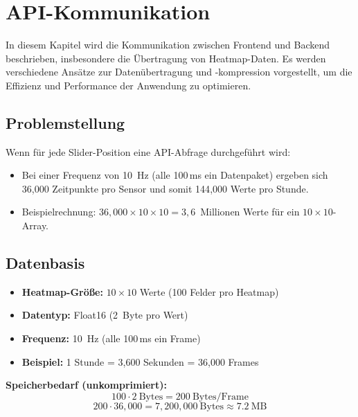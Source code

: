 \chapter{API-Kommunikation}
\label{cha:api_kommunikation}
In diesem Kapitel wird die Kommunikation zwischen Frontend und Backend beschrieben, insbesondere die Übertragung von Heatmap-Daten. Es werden verschiedene Ansätze zur Datenübertragung und -kompression vorgestellt, um die Effizienz und Performance der Anwendung zu optimieren.
\section{Problemstellung}
Wenn für jede Slider-Position eine API-Abfrage durchgeführt wird:
\begin{itemize}
    \item Bei einer Frequenz von 10~Hz (alle 100\,ms ein Datenpaket) ergeben sich 36{,}000 Zeitpunkte pro Sensor und somit 144{,}000 Werte pro Stunde.
    \item Beispielrechnung: $36{,}000 \times 10 \times 10 = 3{,}6$~Millionen Werte für ein $10\times10$-Array.
\end{itemize}

\section{Datenbasis}
\begin{itemize}
    \item \textbf{Heatmap-Größe:} $10\times10$ Werte (100 Felder pro Heatmap)
    \item \textbf{Datentyp:} Float16 (2~Byte pro Wert)
    \item \textbf{Frequenz:} 10~Hz (alle 100\,ms ein Frame)
    \item \textbf{Beispiel:} 1 Stunde = 3{,}600 Sekunden = 36{,}000 Frames
\end{itemize}

\noindent\textbf{Speicherbedarf (unkomprimiert):}
\[
100 \cdot 2\ \text{Bytes} = 200\ \text{Bytes/Frame}
\]
\[
200 \cdot 36{,}000 = 7{,}200{,}000\ \text{Bytes} \approx 7.2\ \text{MB}
\]

